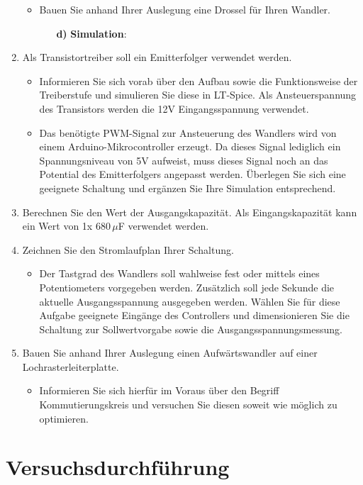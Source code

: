 \documentclass{article}
\begin{document}
\begin{enumerate}
\begin{itemize}
        \item Bauen Sie anhand Ihrer Auslegung eine Drossel für Ihren Wandler.
        \begin{enumerate}
            \item[\textbf{d)}] \textbf{Simulation}:
        \end{enumerate}

    \end{itemize}

    \item Als Transistortreiber soll ein Emitterfolger verwendet werden.
    \begin{itemize}
        \item Informieren Sie sich vorab über den Aufbau sowie die Funktionsweise der Treiberstufe und simulieren Sie diese in LT-Spice. Als Ansteuerspannung des Transistors werden die 12V Eingangsspannung verwendet.
        \item Das benötigte PWM-Signal zur Ansteuerung des Wandlers wird von einem Arduino-Mikrocontroller erzeugt. Da dieses Signal lediglich ein Spannungsniveau von 5V aufweist, muss dieses Signal noch an das Potential des Emitterfolgers angepasst werden. Überlegen Sie sich eine geeignete Schaltung und ergänzen Sie Ihre Simulation entsprechend.
    \end{itemize}

    \item Berechnen Sie den Wert der Ausgangskapazität. Als Eingangskapazität kann ein Wert von 1x 680\,$\mu$F verwendet werden.

    \item Zeichnen Sie den Stromlaufplan Ihrer Schaltung.
    \begin{itemize}
        \item Der Tastgrad des Wandlers soll wahlweise fest oder mittels eines Potentiometers vorgegeben werden. Zusätzlich soll jede Sekunde die aktuelle Ausgangsspannung ausgegeben werden. Wählen Sie für diese Aufgabe geeignete Eingänge des Controllers und dimensionieren Sie die Schaltung zur Sollwertvorgabe sowie die Ausgangsspannungsmessung.
    \end{itemize}

    \item Bauen Sie anhand Ihrer Auslegung einen Aufwärtswandler auf einer Lochrasterleiterplatte.
    \begin{itemize}
        \item Informieren Sie sich hierfür im Voraus über den Begriff Kommutierungskreis und versuchen Sie diesen soweit wie möglich zu optimieren.
    \end{itemize}
\end{enumerate}

\newpage
\section{Versuchsdurchführung}
\end{document}
